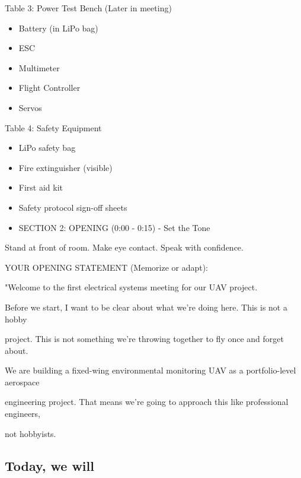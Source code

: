 \documentclass[11pt,letterpaper]{article}
\begin{document}
{Table 3: Power Test Bench (Later in meeting)\par

\begin{itemize}
  \item Battery (in LiPo bag)
  \item ESC
  \item Multimeter
  \item Flight Controller
  \item Servos
\end{itemize}

Table 4: Safety Equipment\par

\begin{itemize}
  \item LiPo safety bag
  \item Fire extinguisher (visible)
  \item First aid kit
  \item Safety protocol sign-off sheets
\end{itemize}

\begin{itemize}
  \item SECTION 2: OPENING (0:00 - 0:15) - Set the Tone
\end{itemize}

Stand at front of room. Make eye contact. Speak with confidence.\par

YOUR OPENING STATEMENT (Memorize or adapt):\par

"Welcome to the first electrical systems meeting for our UAV project.\par

Before we start, I want to be clear about what we're doing here. This is not a hobby\par

project. This is not something we're throwing together to fly once and forget about.\par

We are building a fixed-wing environmental monitoring UAV as a portfolio-level aerospace\par

engineering project. That means we're going to approach this like professional engineers,\par

not hobbyists.\par

\subsection{Today, we will}

}
\end{document}
